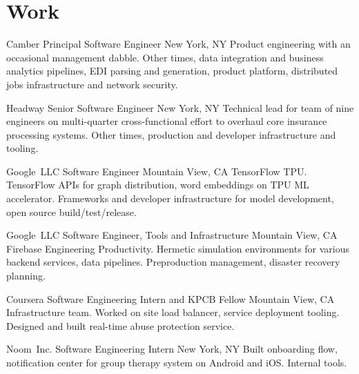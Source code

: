 \documentclass[11pt,letterpaper]{moderncv}
\begin{document}
\makecvtitle

\section{Work}

        {Camber}
        {Principal Software Engineer}
        {New York, NY}
        {}
	    {Product engineering with an occasional management dabble. Other times, data integration and business analytics pipelines, EDI parsing and generation, product platform, distributed jobs infrastructure and network security.  \\}

        {Headway}
        {Senior Software Engineer}
        {New York, NY}
        {}
	{Technical lead for team of nine engineers on multi-quarter cross-functional effort to overhaul core insurance processing systems. Other times, production and developer infrastructure and tooling. \\}

        {Google~LLC}
        {Software Engineer}
        {Mountain View, CA}
        {}
        {TensorFlow TPU. TensorFlow APIs for graph distribution, word embeddings on TPU ML accelerator. Frameworks and developer infrastructure for model development, open source build/test/release. \\}

        {Google~LLC}
        {Software Engineer, Tools and Infrastructure}
        {Mountain View, CA}
        {}
        {Firebase Engineering Productivity. Hermetic simulation environments for various backend services, data pipelines. Preproduction management, disaster recovery planning.\\}

        {Coursera}
        {Software Engineering Intern and KPCB Fellow}
        {Mountain View, CA}
        {}
        {Infrastructure team. Worked on site load balancer, service deployment tooling. \\Designed and built real-time abuse protection service. \\}

        {Noom~Inc.}
        {Software Engineering Intern}
        {New York, NY}
        {}
        {Built onboarding flow, notification center for group therapy system on Android and iOS. Internal tools.\\}
\end{document}
